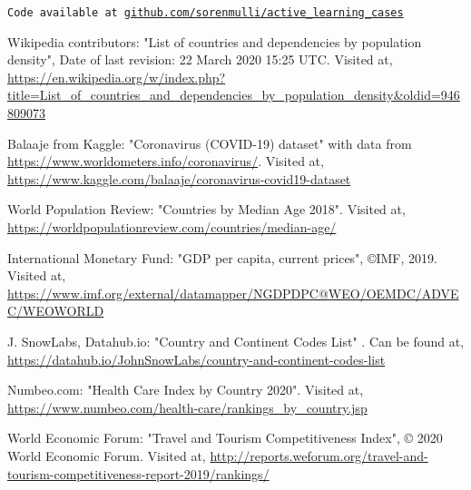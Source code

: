 \documentclass[12pt,fleqn]{article}
\begin{document}
\newpage
\texttt{Code available at \url{github.com/sorenmulli/active_learning_cases}}
	\begin{thebibliography}{9}
	
	
		
		 Wikipedia contributors: "List of countries and dependencies by population density", Date of last revision: 22 March 2020 15:25 UTC. Visited at,  \url{ https://en.wikipedia.org/w/index.php?title=List_of_countries_and_dependencies_by_population_density&oldid=946809073}
		
		 Balaaje from Kaggle: "Coronavirus (COVID-19) dataset" with data from \url{https://www.worldometers.info/coronavirus/}. Visited at, \url{https://www.kaggle.com/balaaje/coronavirus-covid19-dataset}
		
		 World Population Review: "Countries by Median Age 2018". Visited at, \url{https://worldpopulationreview.com/countries/median-age/}
		
		 International Monetary Fund: "GDP per capita, current prices", ©IMF, 2019. Visited at, \url{https://www.imf.org/external/datamapper/NGDPDPC@WEO/OEMDC/ADVEC/WEOWORLD}
		
		 J. SnowLabs, Datahub.io: "Country and Continent Codes List" . Can be found at, \url{https://datahub.io/JohnSnowLabs/country-and-continent-codes-list}
		
		 Numbeo.com: "Health Care Index by Country 2020". Visited at, \url{https://www.numbeo.com/health-care/rankings_by_country.jsp}
		
		 World Economic Forum: "Travel and Tourism Competitiveness Index", © 2020 World Economic Forum. Visited at, \url{http://reports.weforum.org/travel-and-tourism-competitiveness-report-2019/rankings/}
		
		
		
		
		
	\end{thebibliography}
	
	
	
\end{document}
